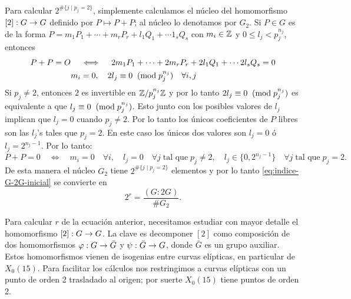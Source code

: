 Para calcular $2^{\#\{j\mid p_j=2\}}$, simplemente calculamos el núcleo del homomorfismo $[2]:G\rightarrow G$ definido por $P\mapsto P+P$; al núcleo lo denotamos por $G_2$. Si $P\in G$ es de la forma $P=m_1 P_1+\cdots+m_r P_r+l_1Q_1+\cdots 1_s Q_s$ con $m_i\in\mathbb{Z}$ y $0\leq l_j<p_j^{n_j}$, entonces
\begin{align*}
	P+P=O&\quad\iff\quad 2m_1 P_1+\cdots+2m_r P_r+2l_1Q_1+\cdots 2l_s Q_s=0\\
&m_i=0,\quad 2l_j\equiv0\;\;(\mathrm{mod}\; p_j^{n_j})\quad\forall i,j	
\end{align*}
Si $p_j\neq2$, entonces $2$ es invertible en $\mathbb{Z}/p_j^{n_j}\mathbb{Z}$ y por lo tanto $2l_j\equiv0\;\;(\mathrm{mod}\; p_j^{n_j})$ es equivalente a que $l_j\equiv0\;\;(\mathrm{mod}\; p_j^{n_j})$. Esto junto con los posibles valores de $l_j$ implican que $l_j=0$ cuando $p_j\neq2$. Por lo tanto los únicos coeficientes de $P$ libres son las $l_j$'s tales que $p_j=2$. En este caso los únicos dos valores son $l_j=0$ ó $l_j=2^{n_j-1}$. Por lo tanto:
\[
	P+P=0\quad\iff\quad m_i=0\quad\forall i,\quad l_j=0\quad\forall j\;\text{tal que}\; p_j\neq2, \quad l_j\in\{0,2^{n_j-1}\}\quad\forall j\;\text{tal que}\; p_j=2.
\]
De esta manera el núcleo $G_2$ tiene $2^{\#\{j\mid p_j=2\}}$ elementos y por lo tanto \eqref{eq:indice-G-2G-inicial} se convierte en
\begin{equation}\label{eq:indice-G-2G}
	2^r =\frac{(G:2G)}{\# G_2}.
\end{equation}

Para calcular $r$ de la ecuación anterior, necesitamos estudiar con mayor detalle el homomorfismo $[2]:G\rightarrow G$. La clave es decomponer $[2]$ como composición de dos homomorfismos $\varphi:G\rightarrow \bar{G}$ y $\psi:\bar{G}\rightarrow G$, donde $\bar{G}$ es un grupo auxiliar. Estos homomorfismos vienen de isogenias entre curvas elípticas, en particular de $X_0(15)$. Para facilitar los cálculos nos restringimos a curvas elípticas con un punto de orden 2 trasladado al origen; por suerte $X_0(15)$ tiene puntos de orden 2.

